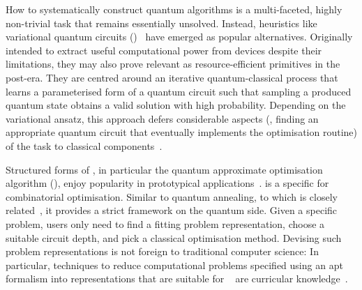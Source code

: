 How to systematically construct quantum algorithms is a multi-faceted, highly non-trivial task that remains essentially unsolved. Instead, heuristics like variational quantum circuits (\VQC)~\cite{Cerezo:2021} have emerged as popular alternatives. Originally intended to extract useful computational power from \NISQ devices despite their limitations, they may also prove relevant as resource-efficient primitives in the post-\NISQ era. They are centred around an iterative quantum-classical process that learns a parameterised form of a quantum circuit such that sampling a produced quantum state obtains a valid solution with high probability. Depending on the variational ansatz, this approach defers considerable aspects (\ie, finding an
appropriate quantum circuit that eventually implements the optimisation routine) of the task to classical components~\cite{PellowJarman:2024,FernndezPends:2022,zhou2020quantum}.

Structured forms of \VQCs, in particular the quantum approximate 
optimisation algorithm (\QAOA), enjoy popularity in prototypical 
applications~\cite{bayerstadler:21:}. \QAOA is a specific \VQC for 
combinatorial optimisation. Similar to quantum annealing, to which \QAOA 
is closely related~\cite{pelofske2024short,Bharti:2022}, it 
provides a strict framework on the quantum side. Given a 
specific problem, users only need to find a fitting problem 
representation, choose a suitable circuit depth, and pick a classical 
optimisation method. Devising such problem representations 
is not foreign to traditional computer science: In 
particular, techniques to reduce computational problems
specified using an apt formalism into
representations that are suitable for \QAOA~\cite{schmidbauer:24:reductions,cipra2000ising,lucas2014ising} are curricular knowledge~\cite{Arora:2009}.

